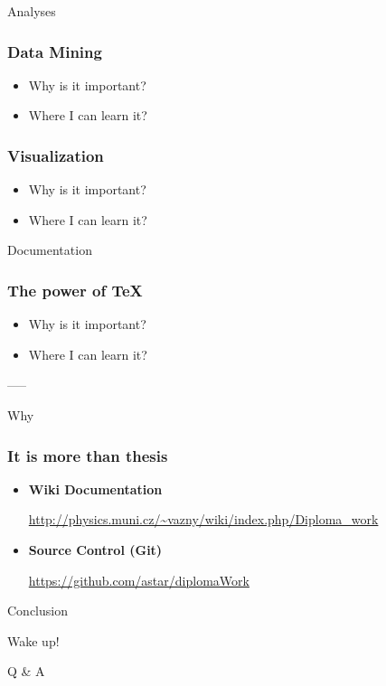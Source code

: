 \documentclass[fleqn]{beamer}
\begin{document}

\begin{section}{Analyses}
  \begin{frame}\frametitle{Data Mining}
  \begin{itemize}
    \item{Why is it important?}
    \item{Where I can learn it?}
  \end{itemize}
  \end{frame}

  \begin{frame}\frametitle{Visualization}
  \begin{itemize}
    \item{Why is it important?}
    \item{Where I can learn it?}
  \end{itemize}

  \end{frame}
\end{section}


\begin{section}{Documentation}
  \begin{frame}\frametitle{The power of \TeX}
  \begin{itemize}
    \item{Why is it important?}
    \item{Where I can learn it?}
  \end{itemize}

\end{frame}

\end{section}
-----


\begin{section}{Why}

\begin{frame}\frametitle{It is more than thesis}
  \begin{itemize}
  \item \textbf{Wiki Documentation}

    \url{http://physics.muni.cz/~vazny/wiki/index.php/Diploma_work}
  \item \textbf{Source Control (Git)}

    \url{https://github.com/astar/diplomaWork}

  \end{itemize}
\end{frame}
\end{section}


\begin{section}{Conclusion}
\begin{frame}
  \begin{center}
 \huge{Wake up!}

 \bigskip

 \huge Q \& A    
  \end{center}
\end{frame}
\end{section}
\end{document}
